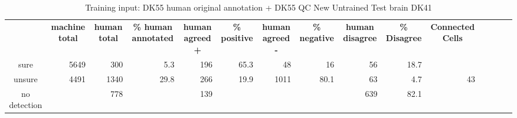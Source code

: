 
\begin{table}[]
\caption{Training input: DK55 human original annotation + DK55 QC
New Untrained Test brain DK41}
\label{tab:my-table}
\begin{tabular}{crrrrrrrrrlllll}
\multicolumn{1}{l}{} & \multicolumn{1}{c}{\textbf{machine total}} & \multicolumn{1}{c}{\cellcolor[HTML]{FFFFFF}\textbf{human total}} & \multicolumn{1}{c}{\cellcolor[HTML]{FFFFFF}\textbf{\% human annotated}} & \multicolumn{1}{c}{\textbf{human agreed +}} & \multicolumn{1}{c}{\textbf{\% positive}} & \multicolumn{1}{c}{\textbf{human agreed -}} & \multicolumn{1}{c}{\textbf{\% negative}} & \multicolumn{1}{c}{\textbf{human disagree}} & \multicolumn{1}{c}{\textbf{\% Disagree}} & \multicolumn{1}{c}{\textbf{Connected Cells}} &  &  &  &  \\
sure                 & 5649                                       & 300                                                              & 5.3                                                                     & 196                                         & 65.3                                     & 48                                          & 16                                       & 56                                          & 18.7                                     &                                              &  &  &  &  \\
unsure               & 4491                                       & 1340                                                             & 29.8                                                                    & 266                                         & 19.9                                     & 1011                                        & 80.1                                     & 63                                          & 4.7                                      & \multicolumn{1}{r}{43}                       &  &  &  &  \\
no detection         & \multicolumn{1}{l}{}                       & 778                                                              & \multicolumn{1}{l}{}                                                    & 139                                         & \multicolumn{1}{l}{}                     & \multicolumn{1}{l}{}                        & \multicolumn{1}{l}{}                     & 639                                         & 82.1                                     &                                              &  &  &  & 
\end{tabular}
\end{table}
